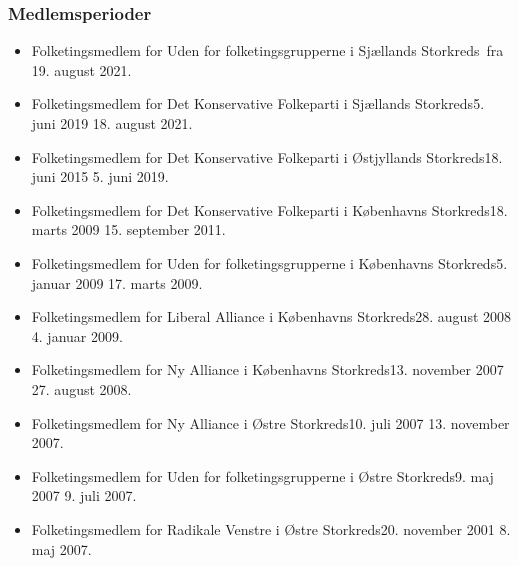 \documentclass[11pt, a4paper]{awesome-cv}
\begin{document}
\begin{cvletter}
\subsubsection*{Medlemsperioder}
\begin{itemize}
\item Folketingsmedlem for Uden for folketingsgrupperne i Sjællands Storkreds fra 19. august 2021.
\item Folketingsmedlem for Det Konservative Folkeparti i Sjællands Storkreds5. juni 2019  18. august 2021.
\item Folketingsmedlem for Det Konservative Folkeparti i Østjyllands Storkreds18. juni 2015  5. juni 2019.
\item Folketingsmedlem for Det Konservative Folkeparti i Københavns Storkreds18. marts 2009  15. september 2011.
\item Folketingsmedlem for Uden for folketingsgrupperne i Københavns Storkreds5. januar 2009  17. marts 2009.
\item Folketingsmedlem for Liberal Alliance i Københavns Storkreds28. august 2008  4. januar 2009.
\item Folketingsmedlem for Ny Alliance i Københavns Storkreds13. november 2007  27. august 2008.
\item Folketingsmedlem for Ny Alliance i Østre Storkreds10. juli 2007  13. november 2007.
\item Folketingsmedlem for Uden for folketingsgrupperne i Østre Storkreds9. maj 2007  9. juli 2007.
\item Folketingsmedlem for Radikale Venstre i Østre Storkreds20. november 2001  8. maj 2007.
\end{itemize}

\end{cvletter}
\end{document}
